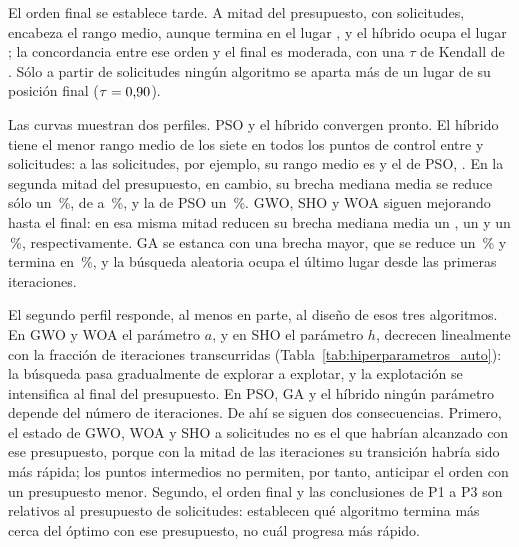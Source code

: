 \TablaConvergenciaAuto

El orden final se establece tarde. A mitad del presupuesto, con \ConvHalfRequests{} solicitudes, \ConvHalfLeader{} encabeza el rango medio, aunque termina en el lugar \ConvHalfLeaderFinalPosition, y el híbrido ocupa el lugar \ConvHalfControlPosition; la concordancia entre ese orden y el final es moderada, con una $\tau$ de Kendall de \ConvTauHalf. Sólo a partir de \ConvSettleFrom{} solicitudes ningún algoritmo se aparta más de un lugar de su posición final ($\tau=\text{0,90}$).

Las curvas muestran dos perfiles. PSO y el híbrido convergen pronto. El híbrido tiene el menor rango medio de los siete en todos los puntos de control entre \ConvControlLeadFrom{} y \ConvControlLeadTo{} solicitudes: a las \ConvEarlyRequests{} solicitudes, por ejemplo, su rango medio es \ConvRankEarlyPsoGa{} y el de PSO, \ConvRankEarlyPso. En la segunda mitad del presupuesto, en cambio, su brecha mediana media se reduce sólo un \ConvReductionPsoGa\,\%, de \ConvGapHalfPsoGa{} a \ConvGapFinalPsoGa\,\%, y la de PSO un \ConvReductionPso\,\%. GWO, SHO y WOA siguen mejorando hasta el final: en esa misma mitad reducen su brecha mediana media un \ConvReductionGwo, un \ConvReductionSho{} y un \ConvReductionWoa\,\%, respectivamente. GA se estanca con una brecha mayor, que se reduce un \ConvReductionGa\,\% y termina en \ConvGapFinalGa\,\%, y la búsqueda aleatoria ocupa el último lugar desde las primeras iteraciones.

El segundo perfil responde, al menos en parte, al diseño de esos tres algoritmos. En GWO y WOA el parámetro $a$, y en SHO el parámetro $h$, decrecen linealmente con la fracción de iteraciones transcurridas (Tabla~\ref{tab:hiperparametros_auto}): la búsqueda pasa gradualmente de explorar a explotar, y la explotación se intensifica al final del presupuesto. En PSO, GA y el híbrido ningún parámetro depende del número de iteraciones. De ahí se siguen dos consecuencias. Primero, el estado de GWO, WOA y SHO a \ConvHalfRequests{} solicitudes no es el que habrían alcanzado con ese presupuesto, porque con la mitad de las iteraciones su transición habría sido más rápida; los puntos intermedios no permiten, por tanto, anticipar el orden con un presupuesto menor. Segundo, el orden final y las conclusiones de P1 a P3 son relativos al presupuesto de \RequestsPerRun{} solicitudes: establecen qué algoritmo termina más cerca del óptimo con ese presupuesto, no cuál progresa más rápido.

